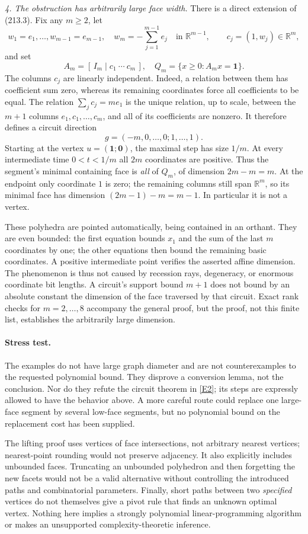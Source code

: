 \documentclass[11pt,a4paper]{article}
\newcommand{\R}{\mathbb{R}}
\newcommand{\eref}[2]{\hyperlink{extra:#1:#2}{[E#2]}}
\begin{document}
\textit{4. The obstruction has arbitrarily large face width.}
There is a direct extension of (213.3). Fix any $m\ge2$, let
\[
 w_1=e_1,\ldots,w_{m-1}=e_{m-1},\quad
 w_m=-\sum_{j=1}^{m-1}e_j\quad\text{in }\R^{m-1},
 \qquad c_j=(1,w_j)\in\R^m,
\]
and set
\[
 A_m=[\,I_m\mid c_1\ \cdots\ c_m\,],\quad
 Q_m=\{x\ge0:A_mx=\mathbf1\}.
\]
The columns $c_j$ are linearly independent. Indeed, a relation between them
has coefficient sum zero, whereas its remaining coordinates force all
coefficients to be equal. The relation
$\sum_jc_j=m e_1$ is the unique relation, up to scale, between the $m+1$
columns $e_1,c_1,\ldots,c_m$, and all of its coefficients are nonzero.
It therefore defines a circuit direction
\[
 g=(-m,0,\ldots,0;1,\ldots,1).
\]
Starting at the vertex $u=(\mathbf1;\mathbf0)$, the maximal step has size
$1/m$. At every intermediate time $0<t<1/m$ all $2m$ coordinates are
positive. Thus the segment's minimal containing face is \emph{all} of
$Q_m$, of dimension $2m-m=m$. At the endpoint only coordinate $1$ is zero;
the remaining columns still span $\R^m$, so its minimal face has dimension
$(2m-1)-m=m-1$. In particular it is not a vertex.

These polyhedra are pointed automatically, being contained in an orthant.
They are even bounded: the first equation bounds $x_1$ and the sum of the
last $m$ coordinates by one; the other equations then bound the remaining
basic coordinates. A positive intermediate point verifies the asserted
affine dimension. The phenomenon is thus not caused by recession rays,
degeneracy, or enormous coordinate bit lengths. A circuit's support bound
$m+1$ does not bound by an absolute constant the dimension of the face
traversed by that circuit. Exact rank checks for $m=2,\ldots,8$ accompany
the general proof, but the proof, not this finite list, establishes the
arbitrarily large dimension.

\paragraph{Stress test.}
The examples do not have large graph diameter and are not counterexamples
to the requested polynomial bound. They disprove a conversion lemma, not
the conclusion. Nor do they refute the circuit theorem in \eref{30001930}{2};
its steps are expressly allowed to have the behavior above. A more careful
route could replace one large-face segment by several low-face segments,
but no polynomial bound on the replacement cost has been supplied.

The lifting proof uses vertices of face intersections, not arbitrary nearest
vertices; nearest-point rounding would not preserve adjacency. It also
explicitly includes unbounded faces. Truncating an unbounded polyhedron and
then forgetting the new facets would not be a valid alternative without
controlling the introduced paths and combinatorial parameters. Finally,
short paths between two \emph{specified} vertices do not themselves give a
pivot rule that finds an unknown optimal vertex. Nothing here implies a
strongly polynomial linear-programming algorithm or makes an unsupported
complexity-theoretic inference.
\end{document}
